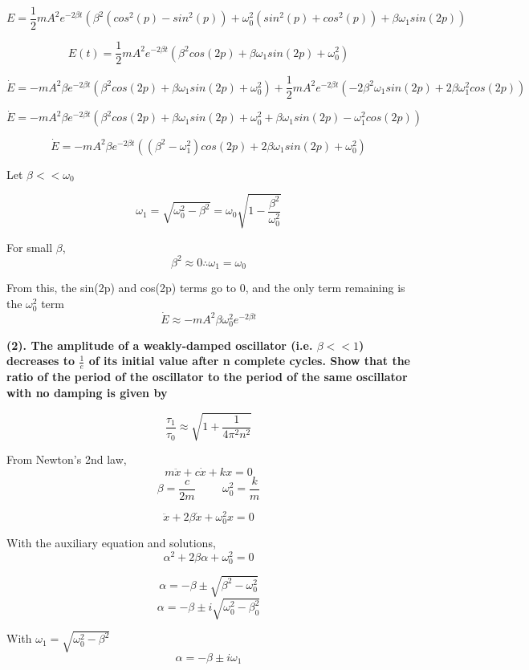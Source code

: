 \documentclass[12pt]{article}
\begin{document}
$$
E = \frac{1}{2} m A^2 e^{-2 \beta t} ( \beta^2 (cos^2(p) - sin^2(p)) + \omega_0^2 ( sin^2(p) + cos^2(p) ) + \beta \omega_1 sin(2p) )
$$

$$
E(t) = \frac{1}{2} m A^2 e^{-2 \beta t} ( \beta^2 cos(2p) + \beta \omega_1 sin(2p) + \omega_0^2 )
$$

$$
\dot{E} = - m A^2 \beta e^{-2 \beta t} ( \beta^2 cos(2p) + \beta \omega_1 sin(2p) + \omega_0^2 ) + \frac{1}{2} m A^2 e^{-2 \beta t} (-2 \beta^2 \omega_1 sin(2p) + 2 \beta \omega_1^2 cos(2p) )
$$

$$
\dot{E} = - m A^2 \beta e^{-2 \beta t} ( \beta^2 cos(2p) + \beta \omega_1 sin(2p) + \omega_0^2 + \beta \omega_1 sin(2p) - \omega_1^2 cos(2p) )
$$

$$
\dot{E} = - m A^2 \beta e^{-2 \beta t} (( \beta^2 - \omega_1^2 )cos(2p) + 2 \beta \omega_1 sin(2p) + \omega_0^2 ) 
$$

Let $\beta << \omega_0$

$$
\omega_1 = \sqrt{\omega_0^2 - \beta^2} = \omega_0 \sqrt{1 - \frac{\beta^2}{\omega_0^2}}
$$

For small $\beta$, 
$$
\beta^2 \approx 0 \therefore \omega_1 = \omega_0
$$

From this, the sin(2p) and cos(2p) terms go to 0, and the only term remaining is the $\omega_0^2$ term
$$
\dot{E} \approx - m A^2 \beta \omega_0^2 e^{-2 \beta t}
$$



\newpage
\textbf{
(2). The amplitude of a weakly-damped oscillator (i.e. $\beta << 1$)
decreases to $\frac{1}{e}$ of its initial value after n complete cycles. Show that the ratio of the period of
the oscillator to the period of the same oscillator with no damping is given by
}

$$
\frac{\tau_1}{\tau_0} \approx \sqrt{1+\frac{1}{4 \pi^2 n^2}}
$$

From Newton's 2nd law,
$$
m\ddot{x} + c \dot{x} + k x = 0
$$
$$
\beta = \frac{c}{2m} \hspace{1cm} \omega_0^2 = \frac{k}{m}
$$

$$
\ddot{x} + 2 \beta \dot{x} + \omega_0^2 x = 0
$$

With the auxiliary equation and solutions, 
$$
\alpha^2 + 2 \beta \alpha + \omega_0^2 = 0
$$

$$
\alpha = -\beta \pm \sqrt{\beta^2 - \omega^2_0}
$$
$$
\alpha = -\beta \pm i\sqrt{\omega_0^2 - \beta^2_0}
$$

With $\omega_1 = \sqrt{\omega_0^2 - \beta^2}$
$$
\alpha = - \beta \pm i \omega_1
$$
\end{document}
